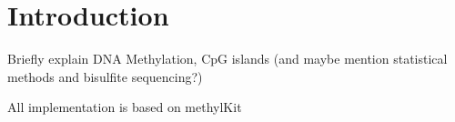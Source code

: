 \section{Introduction}

Briefly explain DNA Methylation, CpG islands (and maybe mention statistical methods and bisulfite sequencing?)

All implementation is based on methylKit \cite{23034086}
  
  
  
  
  
  
  
  
  
  
  